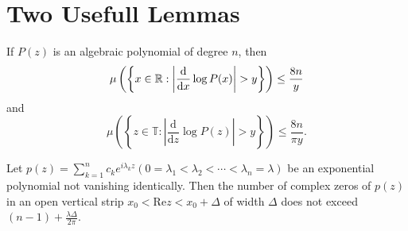 \section{Two Usefull Lemmas}
\begin{lemma}\label{lemma-1}
  If $P(z)$ is an algebraic polynomial of degree $n$, then 
  \[
    \mu \left( \left\{ x\in \mathbb{R}:\left| \frac{\mathrm{d}}{\mathrm{d}x}\log P(x) \right| >y \right\}  \right) \le \frac{8n}{y}
  \] and
  \[
    \mu \left( \left\{ z\in \mathbb{T}:\left| \frac{\mathrm{d}}{\mathrm{d}z}\log P(z) \right| >y \right\}  \right) \le \frac{8n}{\pi y}.
  \] 
\end{lemma}
\begin{lemma}\label{lemma-2}
  Let $p(z)=\sum_{k=1}^{n} c_k e^{i\lambda_k z} (0=\lambda_1<\lambda_2<\cdots<\lambda_n=\lambda)$ be an exponential polynomial not vanishing identically. Then the number of complex zeros of $p(z)$ in an open vertical strip $x_0<\text{Re}z<x_0+\Delta $ of width $\Delta$ does not exceed $(n-1)+ \frac{\lambda \Delta}{2\pi}$.
\end{lemma}
